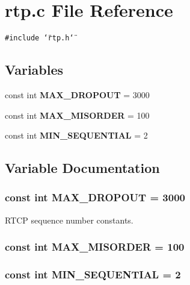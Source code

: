 \section{rtp.c File Reference}
\label{rtp_8c}
{\tt \#include \char`\"{}rtp.h\char`\"{}}\par
\subsection*{Variables}
\begin{CompactItemize}
\item 
const int {\bf MAX\_\-DROPOUT} = 3000
\item 
const int {\bf MAX\_\-MISORDER} = 100
\item 
const int {\bf MIN\_\-SEQUENTIAL} = 2
\end{CompactItemize}


\subsection{Variable Documentation}
\subsubsection{\setlength{\rightskip}{0pt plus 5cm}const int {\bf MAX\_\-DROPOUT} = 3000}\label{rtp_8c_a0}


RTCP sequence number constants. 
\subsubsection{\setlength{\rightskip}{0pt plus 5cm}const int {\bf MAX\_\-MISORDER} = 100}\label{rtp_8c_a1}


\subsubsection{\setlength{\rightskip}{0pt plus 5cm}const int {\bf MIN\_\-SEQUENTIAL} = 2}\label{rtp_8c_a2}


